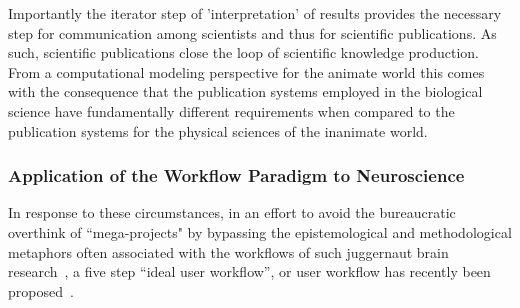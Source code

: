 \documentclass[10pt,letterpaper]{article}
\begin{document}
Importantly the iterator step of 'interpretation' of results provides the necessary step for communication among scientists and thus for scientific publications.  As such, scientific publications close the loop of scientific knowledge production.  From a computational modeling perspective for the animate world this comes with the consequence that the publication systems employed in the biological science have fundamentally different requirements when compared to the publication systems for the physical sciences of the inanimate world.

\subsubsection*{Application of the Workflow Paradigm to Neuroscience}

In response to these circumstances, in an effort to avoid the bureaucratic overthink of ``mega-projects" by bypassing the epistemological and methodological metaphors often associated with the workflows of such juggernaut brain research~\cite{fan19}, a five step “ideal user workflow”, or user workflow has recently been proposed~\cite{cornelis12}.
\end{document}
